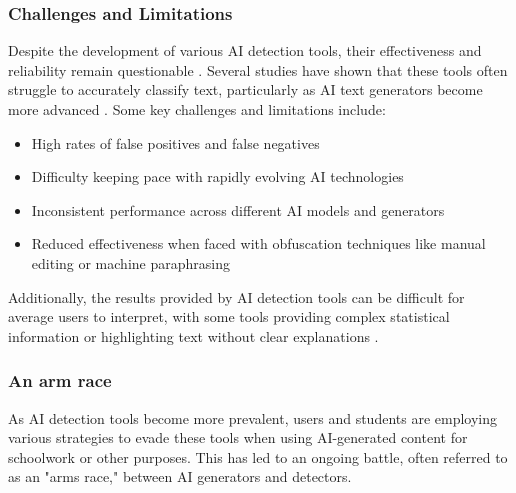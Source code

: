 \documentclass{article}
\begin{document}
\subsubsection{Challenges and Limitations}
Despite the development of various AI detection tools, their effectiveness and reliability remain questionable \cite{https://www.scribbr.com/ai-tools/how-do-ai-detectors-work/} \cite{https://contadu.com/ai-detection-tools-the-challenge-of-todays-digital-age/} \cite{https://edintegrity.biomedcentral.com/articles/10.1007/s40979-023-00140-5}. Several studies have shown that these tools often struggle to accurately classify text, particularly as AI text generators become more advanced \cite{https://contadu.com/ai-detection-tools-the-challenge-of-todays-digital-age/} \cite{https://edintegrity.biomedcentral.com/articles/10.1007/s40979-023-00140-5}. Some key challenges and limitations include:
\begin{itemize}
    \item High rates of false positives and false negatives \cite{https://www.scribbr.com/ai-tools/how-do-ai-detectors-work/} \cite{https://edintegrity.biomedcentral.com/articles/10.1007/s40979-023-00140-5} \cite{https://kb.iu.edu/d/bimt}
    \item Difficulty keeping pace with rapidly evolving AI technologies \cite{https://surferseo.com/blog/how-do-ai-content-detectors-work/} \cite{https://contadu.com/ai-detection-tools-the-challenge-of-todays-digital-age/}
    \item Inconsistent performance across different AI models and generators \cite{https://edintegrity.biomedcentral.com/articles/10.1007/s40979-023-00140-5}
    \item Reduced effectiveness when faced with obfuscation techniques like manual editing or machine paraphrasing \cite{https://edintegrity.biomedcentral.com/articles/10.1007/s40979-023-00146-z}
\end{itemize}
Additionally, the results provided by AI detection tools can be difficult for average users to interpret, with some tools providing complex statistical information or highlighting text without clear explanations \cite{https://edintegrity.biomedcentral.com/articles/10.1007/s40979-023-00146-z}.

\subsubsection{An arm race}
As AI detection tools become more prevalent, users and students are employing various strategies to evade
these tools when using AI-generated content for schoolwork or other purposes. This has led to an ongoing
battle, often referred to as an "arms race," between AI generators and detectors.
\end{document}

